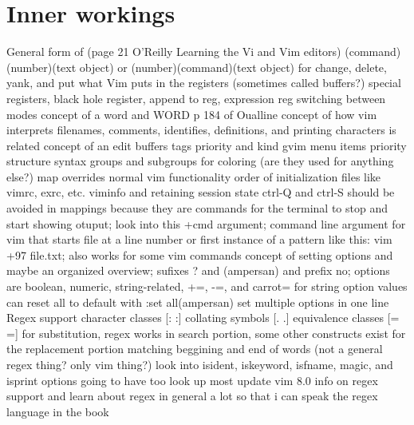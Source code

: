 \documentclass[12pt]{book}
\begin{document}
\section{Inner workings}
General form of (page 21 O'Reilly Learning the Vi and Vim editors) (command)(number)(text object) or (number)(command)(text object) for change, delete, yank, and put
what Vim puts in the registers (sometimes called buffers?) special registers, black hole register, append to reg, expression reg
switching between modes
concept of a word and WORD p 184 of Oualline
  concept of how vim interprets filenames, comments, identifies, definitions, and printing characters is related
concept of an edit
buffers
tags priority and kind
gvim menu items priority structure
syntax groups and subgroups for coloring (are they used for anything else?)
map overrides normal vim functionality
order of initialization files like vimrc, exrc, etc.
viminfo and retaining session state
ctrl-Q and ctrl-S should be avoided in mappings because they are commands for the terminal to stop and start showing otuput; look into this
+cmd argument; command line argument for vim that starts file at a line number or first instance of a pattern like this: vim +97 file.txt; also works for some vim commands
concept of setting options and maybe an organized overview; sufixes ? and (ampersan) and prefix no;
  options are boolean, numeric, string-related,
    +=, -=, and carrot= for string option values
    can reset all to default with :set all(ampersan)
    set multiple options in one line
Regex support
  character classes [: :]
  collating symbols [. .]
  equivalence classes [= =]
  for substitution, regex works in search portion, some other constructs exist for the replacement portion
  matching beggining and end of words (not a general regex thing? only vim thing?)
  look into isident, iskeyword, isfname, magic, and isprint options
  going to have too look up most update vim 8.0 info on regex support and learn about regex in general a lot so that i can speak the regex language in the book
\end{document}
